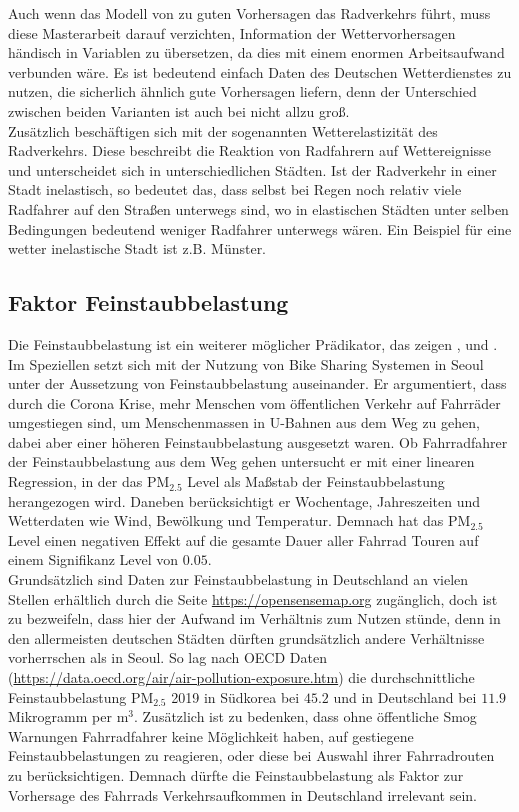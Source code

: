 \documentclass[a4paper,12pt]{thesis}
\begin{document}
Auch wenn das Modell von \cite{Wessel2020} zu guten Vorhersagen das Radverkehrs führt, muss diese Masterarbeit darauf verzichten, Information der Wettervorhersagen händisch in Variablen zu übersetzen, da dies mit einem enormen Arbeitsaufwand verbunden wäre. Es ist bedeutend einfach Daten des Deutschen Wetterdienstes zu nutzen, die sicherlich ähnlich gute Vorhersagen liefern, denn der Unterschied zwischen beiden Varianten ist auch bei \cite{Wessel2020} nicht allzu groß.\\
Zusätzlich beschäftigen sich \cite{Goldmann2021} mit der sogenannten Wetterelastizität des Radverkehrs. Diese beschreibt die Reaktion von Radfahrern auf Wettereignisse und unterscheidet sich in unterschiedlichen Städten. Ist der Radverkehr in einer Stadt inelastisch, so bedeutet das, dass selbst bei Regen noch relativ viele Radfahrer auf den Straßen unterwegs sind, wo in elastischen Städten unter selben Bedingungen bedeutend weniger Radfahrer unterwegs wären. Ein Beispiel für eine wetter inelastische Stadt ist z.B. Münster.


\subsection{Faktor Feinstaubbelastung}

Die Feinstaubbelastung ist ein weiterer möglicher Prädikator, das zeigen \cite{ZHAO2018826}, \cite{Gao2022} und \cite{Hong2022}. Im Speziellen setzt sich \cite{Hong2022} mit der Nutzung von Bike Sharing Systemen in Seoul unter der Aussetzung von Feinstaubbelastung auseinander. Er argumentiert, dass durch die Corona Krise, mehr Menschen vom öffentlichen Verkehr auf Fahrräder umgestiegen sind, um Menschenmassen in U-Bahnen aus dem Weg zu gehen, dabei aber einer höheren Feinstaubbelastung ausgesetzt waren. Ob Fahrradfahrer der Feinstaubbelastung aus dem Weg gehen untersucht er mit einer linearen Regression, in der das PM$_{2.5}$ Level als Maßstab der Feinstaubbelastung herangezogen wird. Daneben berücksichtigt er Wochentage, Jahreszeiten und Wetterdaten wie Wind, Bewölkung und Temperatur. Demnach hat das PM$_{2.5}$ Level einen negativen Effekt auf die gesamte Dauer aller Fahrrad Touren auf einem Signifikanz Level von $0.05$.\\
Grundsätzlich sind Daten zur Feinstaubbelastung in Deutschland an vielen Stellen erhältlich durch die Seite \url{https://opensensemap.org} zugänglich, doch ist zu bezweifeln, dass hier der Aufwand im Verhältnis zum Nutzen stünde, denn in den allermeisten deutschen Städten dürften grundsätzlich andere Verhältnisse vorherrschen als in Seoul. So lag nach OECD Daten (\url{https://data.oecd.org/air/air-pollution-exposure.htm}) die durchschnittliche Feinstaubbelastung PM$_{2.5}$ 2019 in Südkorea bei $45.2$ und in Deutschland bei $11.9$ Mikrogramm per m$^3$. Zusätzlich ist zu bedenken, dass ohne öffentliche Smog Warnungen Fahrradfahrer keine Möglichkeit haben, auf gestiegene Feinstaubbelastungen zu reagieren, oder diese bei Auswahl ihrer Fahrradrouten zu berücksichtigen. Demnach dürfte die Feinstaubbelastung als Faktor zur Vorhersage des Fahrrads Verkehrsaufkommen in Deutschland irrelevant sein.
\end{document}
